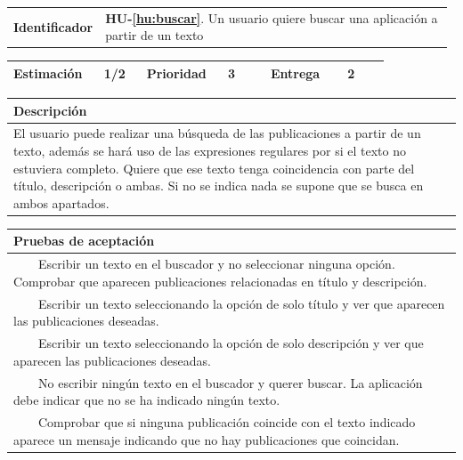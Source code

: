 \documentclass[11pt]{article}
\newcommand{\tabitem}{~~\llap{\textbullet}~~}
\begin{document}
\begin{longtable}{p{0.18\linewidth}|p{0.8\linewidth}}
  \rowcolor{LightCyan}
  \textbf{Identificador} & \textbf{{HU-\ref{hu:buscar}}}. Un usuario quiere buscar una aplicación a partir de un texto \\  
\end{longtable}
\vspace{-0.8cm}
\begin{longtable}{p{0.18\linewidth}|p{0.1\linewidth}|p{0.18\linewidth}|p{0.1\linewidth}|p{0.18\linewidth}|p{0.1\linewidth}}
  \toprule
  \textbf{Estimación} & 1/2 & \textbf{Prioridad} & 3 & \textbf{Entrega} & 2 \\
  \bottomrule
\end{longtable}
\vspace{-0.8cm}
\begin{longtable}{p{1.028\linewidth}}
  \textbf{Descripción}\\
  \midrule
  El usuario puede realizar una búsqueda de las publicaciones a partir de un texto, además se hará uso de las expresiones regulares por si el texto no estuviera completo. Quiere que ese texto tenga coincidencia con parte del título, descripción o ambas. Si no se indica nada se supone que se busca en ambos apartados.\\
  \bottomrule
\end{longtable}
\vspace{-0.8cm}
\begin{longtable}{p{1.028\linewidth}}
  \textbf{Pruebas de aceptación}\\
  \midrule
  \tabitem Escribir un texto en el buscador y no seleccionar ninguna opción. Comprobar que aparecen publicaciones relacionadas en título y descripción.\\
  \tabitem Escribir un texto seleccionando la opción de solo título y ver que aparecen las publicaciones deseadas.\\
  \tabitem Escribir un texto seleccionando la opción de solo descripción y ver que aparecen las publicaciones deseadas.\\
  \tabitem No escribir ningún texto en el buscador y querer buscar. La aplicación debe indicar que no se ha indicado ningún texto.\\
  \tabitem Comprobar que si ninguna publicación coincide con el texto indicado aparece un mensaje indicando que no hay publicaciones que coincidan.\\
\end{longtable}
\vspace{-0.8cm}
\end{document}
